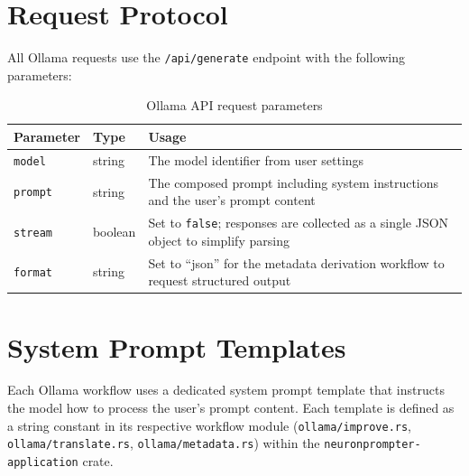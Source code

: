 \documentclass[a4paper, 11pt, oneside]{report}
\begin{document}
\section{Request Protocol}
\label{sec:ollama-protocol}

All Ollama requests use the \texttt{/api/generate} endpoint with the
following parameters:

\begin{table}[H]
  \centering
  \caption{Ollama API request parameters}
  \label{tab:ollama-params}
  \begin{tabularx}{\textwidth}{l l X}
    \toprule
    \textbf{Parameter} & \textbf{Type} & \textbf{Usage} \\
    \midrule
    \texttt{model}  & string & The model identifier from user settings \\
    \texttt{prompt} & string & The composed prompt including system instructions
                               and the user's prompt content \\
    \texttt{stream} & boolean & Set to \texttt{false}; responses are collected
                                as a single JSON object to simplify parsing \\
    \texttt{format} & string & Set to ``json'' for the metadata derivation
                               workflow to request structured output \\
    \bottomrule
  \end{tabularx}
\end{table}

\section{System Prompt Templates}
\label{sec:ollama-templates}

Each Ollama workflow uses a dedicated system prompt template that
instructs the model how to process the user's prompt content.  Each
template is defined as a string constant in its respective workflow
module (\texttt{ollama/improve.rs}, \texttt{ollama/translate.rs},
\texttt{ollama/metadata.rs}) within the
\texttt{neuronprompter-application} crate.
\end{document}
